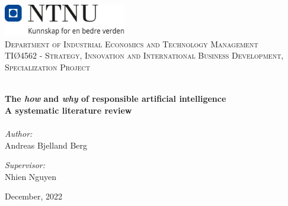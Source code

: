 
\begin{titlepage}
\vbox{ }
\vbox{ }
\begin{center}
\includegraphics[width=0.40\textwidth]{Images/NTNU_logo.png}\\[1cm]
\textsc{\LARGE Department of Industrial Economics and Technology Management}\\[1.5cm]
\textsc{\Large TIØ4562 - Strategy, Innovation and International Business Development, Specialization Project}\\[0.5cm]
\vbox{ }

\HRule \\[0.4cm]
{ \huge \bfseries The \textit{how} and \textit{why} of responsible artificial intelligence}\\[0.4cm]
{ \LARGE \bfseries A systematic literature review}\\[0.4cm]
\HRule \\[1.5cm]

\large
\emph{Author:}\\
Andreas Bjelland Berg

\emph{Supervisor:}\\
Nhien Nguyen
\vfill

{\large December, 2022}
\end{center}
\end{titlepage}